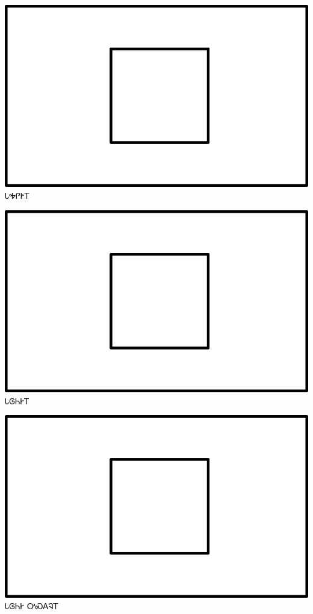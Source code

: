 \documentclass[avery5371]{flashcards}%
\begin{document}
\begin{flashcard}{
\includegraphics[width=0.95\columnwidth,height=.51\columnwidth,keepaspectratio]{../artwork/for-colors/square-white}
}\Huge ᏓᎭᎵᎨᎢ
\end{flashcard}

\begin{flashcard}{
\includegraphics[width=0.95\columnwidth,height=.51\columnwidth,keepaspectratio]{../artwork/for-colors/square-white}
}\Huge ᏓᎶᏂᎨᎢ
\end{flashcard}

\begin{flashcard}{
\includegraphics[width=0.95\columnwidth,height=.51\columnwidth,keepaspectratio]{../artwork/for-colors/square-white}
}\Huge ᏓᎶᏂᎨ ᎤᏍᎪᎸᎢ
\end{flashcard}
\end{document}
